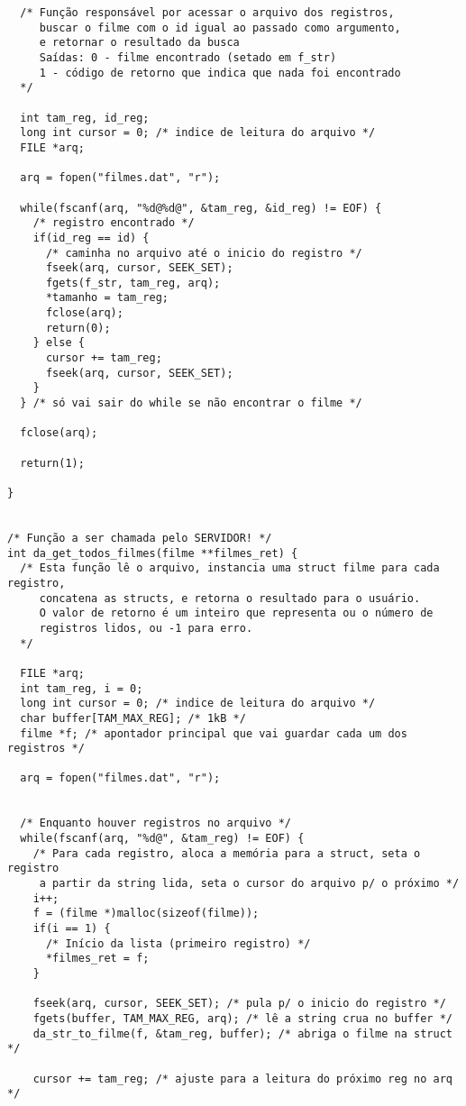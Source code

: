 \documentclass[11pt,twoside]{article}
\begin{document}
\begin{verbatim}
  /* Função responsável por acessar o arquivo dos registros,
     buscar o filme com o id igual ao passado como argumento,
     e retornar o resultado da busca
     Saídas: 0 - filme encontrado (setado em f_str)
     1 - código de retorno que indica que nada foi encontrado
  */

  int tam_reg, id_reg;
  long int cursor = 0; /* indice de leitura do arquivo */
  FILE *arq;

  arq = fopen("filmes.dat", "r");

  while(fscanf(arq, "%d@%d@", &tam_reg, &id_reg) != EOF) {
    /* registro encontrado */
    if(id_reg == id) {
      /* caminha no arquivo até o inicio do registro */
      fseek(arq, cursor, SEEK_SET);
      fgets(f_str, tam_reg, arq);
      *tamanho = tam_reg;
      fclose(arq);
      return(0);
    } else {
      cursor += tam_reg;
      fseek(arq, cursor, SEEK_SET);
    }
  } /* só vai sair do while se não encontrar o filme */
  
  fclose(arq);
  
  return(1);

}


/* Função a ser chamada pelo SERVIDOR! */
int da_get_todos_filmes(filme **filmes_ret) {
  /* Esta função lê o arquivo, instancia uma struct filme para cada registro,
     concatena as structs, e retorna o resultado para o usuário.
     O valor de retorno é um inteiro que representa ou o número de
     registros lidos, ou -1 para erro.
  */

  FILE *arq;
  int tam_reg, i = 0;
  long int cursor = 0; /* indice de leitura do arquivo */
  char buffer[TAM_MAX_REG]; /* 1kB */
  filme *f; /* apontador principal que vai guardar cada um dos registros */

  arq = fopen("filmes.dat", "r");


  /* Enquanto houver registros no arquivo */
  while(fscanf(arq, "%d@", &tam_reg) != EOF) {
    /* Para cada registro, aloca a memória para a struct, seta o registro
     a partir da string lida, seta o cursor do arquivo p/ o próximo */
    i++;
    f = (filme *)malloc(sizeof(filme));
    if(i == 1) {
      /* Início da lista (primeiro registro) */
      *filmes_ret = f;
    }

    fseek(arq, cursor, SEEK_SET); /* pula p/ o inicio do registro */
    fgets(buffer, TAM_MAX_REG, arq); /* lê a string crua no buffer */
    da_str_to_filme(f, &tam_reg, buffer); /* abriga o filme na struct */

    cursor += tam_reg; /* ajuste para a leitura do próximo reg no arq */


\end{verbatim}
\end{document}
